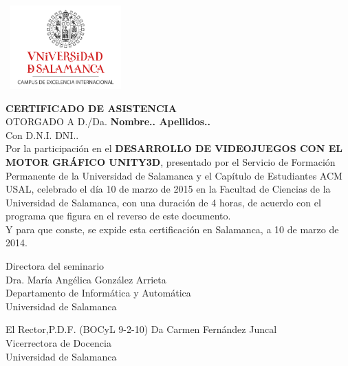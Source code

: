 \documentclass[spanish]{article}
\begin{document}
\hbox{
	\includegraphics[height=3.2cm]{usallogo}
	\hspace{14.2cm}
}
\vspace{0.5cm}
\begin{center}

{\LARGE \textbf{CERTIFICADO DE ASISTENCIA}\\[0.5cm]}
{\Large OTORGADO A D./Da. \textbf{Nombre.. Apellidos..}\\[0.2cm]}
{Con D.N.I. DNI..\\[0.3cm]}
{\large Por la participación en el \textbf{DESARROLLO DE VIDEOJUEGOS CON EL MOTOR GRÁFICO UNITY3D}, presentado por el Servicio de Formación Permanente de la Universidad de Salamanca y el Capítulo de Estudiantes ACM USAL, celebrado el día 10 de marzo de 2015 en la Facultad de Ciencias de la Universidad de Salamanca, con una duración de 4 horas, de acuerdo con el programa que figura en el reverso de este documento.\\[0.5cm]
Y para que conste, se expide esta certificación en Salamanca, a 10 de marzo de 2014.\\}

\vspace*{2cm}

\parbox{0.9\textwidth}{
	\parbox{7cm}{
		\centering
		Directora del seminario\\
		\vspace*{2cm}
		Dra. María Angélica González Arrieta\\
		Departamento de Informática y Automática\\
		Universidad de Salamanca
	}
	\hfill
	\parbox{7cm}{
		\centering
		El Rector,P.D.F. (BOCyL 9-2-10)
		\vspace*{2cm}
		Da Carmen Fernández Juncal\\
		Vicerrectora de Docencia\\
		Universidad de Salamanca
	}
}
\end{center}
\newpage
\end{document}
